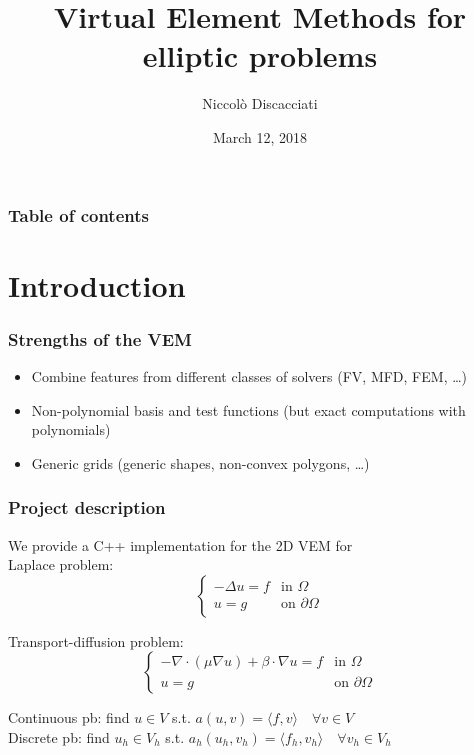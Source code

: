 \documentclass[10pt]{beamer}
\begin{document}
	\title{Virtual Element Methods for elliptic problems}  
	\author{Niccolò Discacciati}
	\date{March 12, 2018} 
	
	\begin{frame}
		\titlepage
	\end{frame}
	
	\begin{frame}\frametitle{Table of contents}
		\tableofcontents
	\end{frame} 
	
	
	\section{Introduction} 
	
	\begin{frame}\frametitle{Strengths of the VEM} 
		\begin{itemize}
		\item Combine features from different classes of solvers (FV, MFD, FEM, \dots) \\
		\item Non-polynomial basis and test functions (but exact computations with polynomials) \\
		\item Generic grids (generic shapes, non-convex polygons, \dots)
		\end{itemize}
	\end{frame}
	\begin{frame} \frametitle{Project description}
		We provide a C++ implementation for the 2D VEM for\\
		\vspace{0.5cm}
		Laplace problem:
		\begin{equation*}
		\begin{cases}
		-\Delta u = f & \mbox{in } \Omega \\
		u = g & \mbox{on } \partial \Omega
		\end{cases}
		\end{equation*}
		
		Transport-diffusion problem:
		\begin{equation*}
		\begin{cases}
		-\nabla \cdot (\mu \nabla u)+\beta \cdot \nabla u = f & \mbox{in } \Omega \\
		u = g & \mbox{on } \partial \Omega
		\end{cases}
		\end{equation*}
		
		Continuous pb: find $u \in V$ s.t. $a(u,v) = \langle f,v \rangle \quad \forall v \in V$ \\
		Discrete pb: find $u_h \in V_h$ s.t. $a_h(u_h,v_h) = \langle f_h,v_h \rangle \quad \forall v_h \in V_h $ \\
	\end{frame}
	
\end{document}

